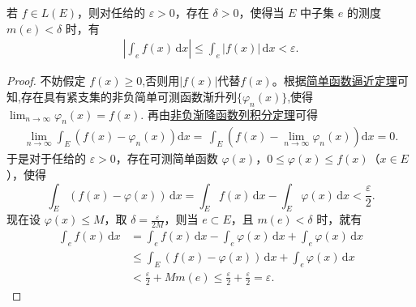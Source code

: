 \documentclass[../../main.tex]{subfiles}%
\begin{document}
\begin{theorem}[积分的绝对连续性]\label{theorem:积分的绝对连续性}
若 $f \in L(E)$，则对任给的 $\varepsilon > 0$，存在 $\delta > 0$，使得当 $E$ 中子集 $e$ 的测度 $m(e) < \delta$ 时，有
\begin{align*}
\left| \int_e f(x) \, \mathrm{d}x \right| \leqslant \int_e |f(x)| \, \mathrm{d}x < \varepsilon.
\end{align*}
\end{theorem}
\begin{proof}
不妨假定 $f(x) \geqslant 0$,否则用$|f(x)|$代替$f(x)$。根据\hyperref[theorem:简单函数逼近定理]{简单函数逼近定理}可知,存在具有紧支集的非负简单可测函数渐升列$\{\varphi_n(x)\}$,使得$\lim_{n\to \infty}\varphi_n(x)=f(x).$
再由\hyperref[corollary:非负渐降函数列积分定理]{非负渐降函数列积分定理}可得
\begin{align*}
\underset{n\rightarrow \infty}{\lim}\int_E{\left( f\left( x \right) -\varphi _n\left( x \right) \right) \mathrm{d}x}=\,\int_E{\left( f\left( x \right) -\underset{n\rightarrow \infty}{\lim}\varphi _n\left( x \right) \right) \mathrm{d}x}=0.
\end{align*}
于是对于任给的 $\varepsilon > 0$，存在可测简单函数 $\varphi(x)$，$0 \leqslant \varphi(x) \leqslant f(x)$（$x \in E$），使得
\[
\int_E (f(x) - \varphi(x)) \, \mathrm{d}x = \int_E f(x) \, \mathrm{d}x - \int_E \varphi(x) \, \mathrm{d}x < \frac{\varepsilon}{2}.
\]
现在设 $\varphi(x) \leqslant M$，取 $\delta = \frac{\varepsilon}{2M}$，则当 $e \subset E$，且 $m(e) < \delta$ 时，就有
\begin{align*}
\int_e f(x) \, \mathrm{d}x &= \int_e f(x) \, \mathrm{d}x - \int_e \varphi(x) \, \mathrm{d}x + \int_e \varphi(x) \, \mathrm{d}x \\
&\leqslant \int_E (f(x) - \varphi(x)) \, \mathrm{d}x + \int_e \varphi(x) \, \mathrm{d}x \\
&< \frac{\varepsilon}{2} + Mm(e) \leqslant \frac{\varepsilon}{2} + \frac{\varepsilon}{2} = \varepsilon.
\end{align*}
\end{proof}
\end{document}
